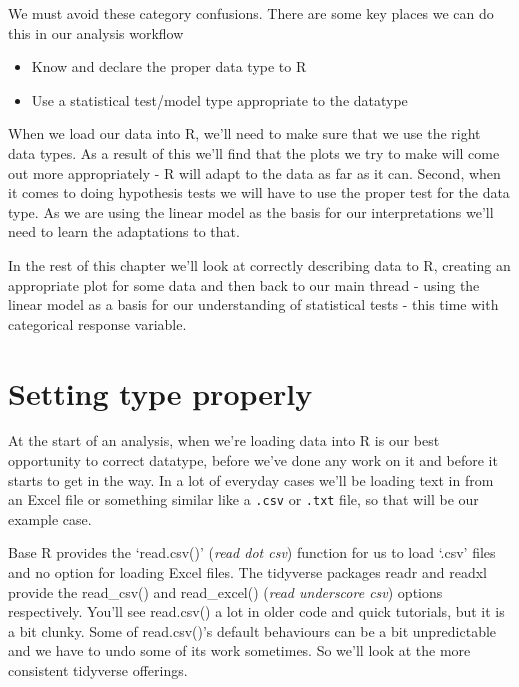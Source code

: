 \documentclass[
]{book}
\providecommand{\tightlist}{%
  \setlength{\itemsep}{0pt}\setlength{\parskip}{0pt}}
\newenvironment{sidenote}
{ \begin{tcolorbox}[colbacktitle=blue!50!white,
title=huh?,coltitle=white,
fonttitle=\bfseries] }
{  \end{tcolorbox} }
\begin{document}
We must avoid these category confusions. There are some key places we can do this in our analysis workflow

\begin{itemize}
\tightlist
\item
  Know and declare the proper data type to R
\item
  Use a statistical test/model type appropriate to the datatype
\end{itemize}

When we load our data into R, we'll need to make sure that we use the right data types. As a result of this we'll find that the plots we try to make will come out more appropriately - R will adapt to the data as far as it can. Second, when it comes to doing hypothesis tests we will have to use the proper test for the data type. As we are using the linear model as the basis for our interpretations we'll need to learn the adaptations to that.

In the rest of this chapter we'll look at correctly describing data to R, creating an appropriate plot for some data and then back to our main thread - using the linear model as a basis for our understanding of statistical tests - this time with categorical response variable.

\hypertarget{setting-type-properly}{%
\section{Setting type properly}\label{setting-type-properly}}

At the start of an analysis, when we're loading data into R is our best opportunity to correct datatype, before we've done any work on it and before it starts to get in the way. In a lot of everyday cases we'll be loading text in from an Excel file or something similar like a \texttt{.csv} or \texttt{.txt} file, so that will be our example case.

\begin{sidenote}
Base R provides the `read.csv()' (\emph{read dot csv}) function for us to load `.csv' files and no option for loading Excel files. The tidyverse packages readr and readxl provide the read\_csv() and read\_excel() (\emph{read underscore csv}) options respectively. You'll see read.csv() a lot in older code and quick tutorials, but it is a bit clunky. Some of read.csv()'s default behaviours can be a bit unpredictable and we have to undo some of its work sometimes. So we'll look at the more consistent tidyverse offerings.
\end{sidenote}
\end{document}

